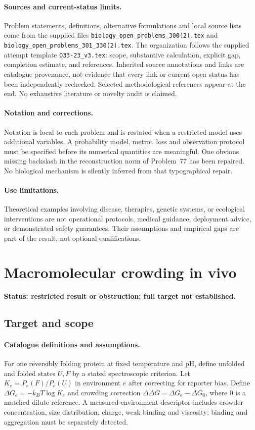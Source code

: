 \documentclass[11pt]{article}
\begin{document}
\paragraph{Sources and current-status limits.}
Problem statements, definitions, alternative formulations and local source lists
come from the supplied files
\texttt{biology\_open\_problems\_300(2).tex} and
\texttt{biology\_open\_problems\_301\_330(2).tex}.
The organization follows the supplied attempt template
\texttt{O33-23\_v3.tex}: scope, substantive calculation, explicit gap,
completion estimate, and references. Inherited source annotations and links are
catalogue provenance, not evidence that every link or current open status has
been independently rechecked. Selected methodological references appear at the
end. No exhaustive literature or novelty audit is claimed.

\paragraph{Notation and corrections.}
Notation is local to each problem and is restated when a restricted model uses
additional variables. A probability model, metric, loss and observation protocol
must be specified before its numerical quantities are meaningful. One obvious
missing backslash in the reconstruction norm of Problem~77 has been repaired.
No biological mechanism is silently inferred from that typographical repair.

\paragraph{Use limitations.}
Theoretical examples involving disease, therapies, genetic systems, or ecological
interventions are not operational protocols, medical guidance, deployment advice,
or demonstrated safety guarantees. Their assumptions and empirical gaps are part
of the result, not optional qualifications.


\section*{Macromolecular crowding in vivo}
\label{prob:007}
\noindent\textbf{Status: restricted result or obstruction; full target not established.}
\subsection{Target and scope}
\paragraph{Catalogue definitions and assumptions.}
For one reversibly folding protein at fixed temperature and pH, define unfolded and folded states $U,F$ by a stated spectroscopic criterion. Let $K_e=P_e(F)/P_e(U)$ in environment $e$ after correcting for reporter bias. Define $\Delta G_e=-k_BT\log K_e$ and crowding correction $\Delta\Delta G=\Delta G_e-\Delta G_0$, where $0$ is a matched dilute reference. A measured environment descriptor includes crowder concentration, size distribution, charge, weak binding and viscosity; binding and aggregation must be separately detected.
\end{document}
